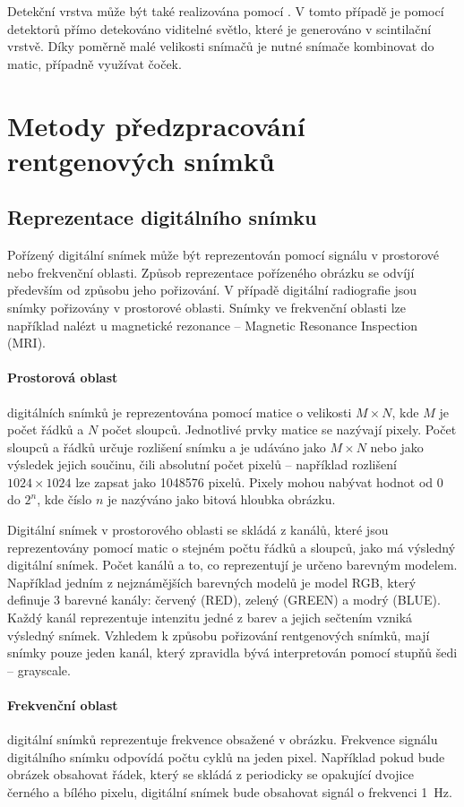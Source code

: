 Detekční vrstva může být také realizována pomocí . V tomto případě je pomocí  detektorů přímo detekováno viditelné světlo, které je generováno v scintilační vrstvě. Díky poměrně malé velikosti  snímačů je nutné snímače kombinovat do matic, případně využívat čoček.

\section{Metody předzpracování rentgenových snímků}

\subsection{Reprezentace digitálního snímku}
Pořízený digitální snímek může být reprezentován pomocí signálu v prostorové nebo frekvenční oblasti. Způsob reprezentace pořízeného obrázku se odvíjí především od způsobu jeho pořizování. V případě digitální radiografie jsou snímky pořizovány v prostorové oblasti. Snímky ve frekvenční oblasti lze například nalézt u magnetické rezonance -- Magnetic Resonance Inspection (MRI).

\paragraph{Prostorová oblast}
digitálních snímků je reprezentována pomocí matice o velikosti $M \times N$, kde $M$ je počet řádků a $N$ počet sloupců. Jednotlivé prvky matice se nazývají pixely. Počet sloupců a řádků určuje rozlišení snímku a je udáváno jako $M \times N$ nebo jako výsledek jejich součinu, čili absolutní počet pixelů -- například rozlišení $1024 \times 1024$ lze zapsat jako \num{1048576} pixelů.  Pixely mohou nabývat hodnot od 0 do $2^{n}$, kde číslo $n$ je nazýváno jako bitová hloubka obrázku. 

Digitální snímek v prostorového oblasti se skládá z kanálů, které jsou reprezentovány pomocí matic o stejném počtu řádků a sloupců, jako má výsledný digitální snímek. Počet kanálů a to, co reprezentují je určeno barevným modelem. Například jedním z nejznámějších barevných modelů je model RGB, který definuje 3 barevné kanály: červený (RED), zelený (GREEN) a modrý (BLUE). Každý kanál reprezentuje intenzitu jedné z barev a jejich sečtením vzniká výsledný snímek. Vzhledem k způsobu pořizování rentgenových snímků, mají snímky pouze jeden kanál, který zpravidla bývá interpretován pomocí stupňů šedi -- grayscale.

\paragraph{Frekvenční oblast}
digitální snímků reprezentuje frekvence obsažené v obrázku. Frekvence signálu digitálního snímku odpovídá počtu cyklů na jeden pixel. Například pokud bude obrázek obsahovat řádek, který se skládá z periodicky se opakující dvojice černého a bílého pixelu, digitální snímek bude obsahovat signál o frekvenci \SI{1}{\hertz}. 

